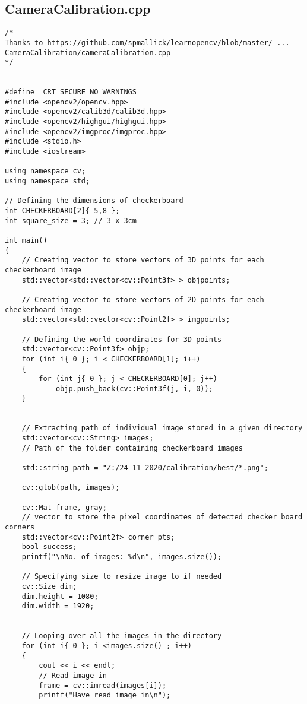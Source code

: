 \begin{appendices}
\section{CameraCalibration.cpp}\label{appendixA}


\begin{verbatim}
/*
Thanks to https://github.com/spmallick/learnopencv/blob/master/ ...
CameraCalibration/cameraCalibration.cpp
*/


#define _CRT_SECURE_NO_WARNINGS
#include <opencv2/opencv.hpp>
#include <opencv2/calib3d/calib3d.hpp>
#include <opencv2/highgui/highgui.hpp>
#include <opencv2/imgproc/imgproc.hpp>
#include <stdio.h>
#include <iostream>

using namespace cv;
using namespace std;

// Defining the dimensions of checkerboard
int CHECKERBOARD[2]{ 5,8 };
int square_size = 3; // 3 x 3cm

int main()
{
	// Creating vector to store vectors of 3D points for each checkerboard image
	std::vector<std::vector<cv::Point3f> > objpoints;

	// Creating vector to store vectors of 2D points for each checkerboard image
	std::vector<std::vector<cv::Point2f> > imgpoints;

	// Defining the world coordinates for 3D points
	std::vector<cv::Point3f> objp;
	for (int i{ 0 }; i < CHECKERBOARD[1]; i++)
	{
		for (int j{ 0 }; j < CHECKERBOARD[0]; j++)
			objp.push_back(cv::Point3f(j, i, 0));
	}


	// Extracting path of individual image stored in a given directory
	std::vector<cv::String> images;
	// Path of the folder containing checkerboard images

	std::string path = "Z:/24-11-2020/calibration/best/*.png";

	cv::glob(path, images);

	cv::Mat frame, gray;
	// vector to store the pixel coordinates of detected checker board corners 
	std::vector<cv::Point2f> corner_pts;
	bool success;
	printf("\nNo. of images: %d\n", images.size());
	
	// Specifying size to resize image to if needed 
	cv::Size dim;
	dim.height = 1080;
	dim.width = 1920;


	// Looping over all the images in the directory
	for (int i{ 0 }; i <images.size() ; i++) 
	{
		cout << i << endl;
		// Read image in
		frame = cv::imread(images[i]);
		printf("Have read image in\n");


\end{verbatim}
\end{appendices}
